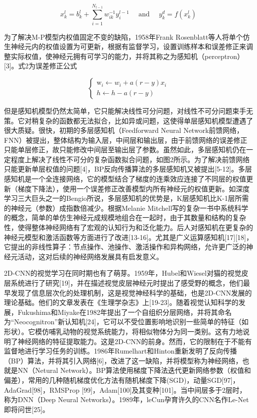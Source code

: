 \documentclass[15pt]{article}
\begin{document}
\begin{equation}
	x_{k}^{l}=b_{k}^{l}+\sum_{i=1}^{N_{l-1}} w_{i k}^{-1} y_{i}^{l-1} \quad \text { and } \quad y_{k}^{d}=f\left(x_{k}^{l}\right)
\end{equation}

为了解决M-P模型内权值固定不变的缺陷，1958年Frank Rosenblatt等人将单个仿生神经元内的权值设置为可更新，根据有监督学习，设置训练样本和误差修正来调整实际权值，使神经元拥有可学习的能力，并将其称之为感知机（perceptron）[3]。式2为误差修正公式

\begin{equation}
	\left\{\begin{array}{l}\mathrm{w}_{i} \leftarrow w_{i}+a(r-y) x_{i} \\ h \leftarrow h-a(r-y)\end{array}\right.
\end{equation}

但是感知机模型仍然太简单，它只能解决线性可分问题，对线性不可分问题束手无策。它对稍复杂的函数都无法拟合，比如异或问题，这使得单层感知机模型遭遇了很大质疑。很快，初期的多层感知机（Feedforward Neural Network前馈网络，FNN）被提出，整体结构为输入层，中间层和输出层，由于前馈网络的误差修正只能单层修正，故只能修改中间层至输出层了参数。虽然如此，多层感知机仍在一定程度上解决了线性不可分的复杂函数拟合问题，如图2所示。为了解决前馈网络只能更新单层权值的问题[4]，BP反向传播算法的多层感知机又被提出[5-12]。多层感知机是一个全连接网络，它的模型结合了梯度的连乘效应连接了不同层的权值更新（梯度下降法），使用一个误差修正改善模型内所有神经元的权值更新。如深度学习三大巨头之一的Bengio所说，多层感知机的优势是，K层感知机比K-1层所需的神经元（参数）成指数倍减少。根据Melanie Mitchell写的复杂一书中系统科学的概念，简单的单仿生神经元成规模地组合在一起时，由于其数量和结构的复杂性，使得整体神经网络有了宏观的认知行为和泛化能力。后人对感知机在更复杂的神经元模型和激活函数等方面进行了改进[13-16]。尤其是广义运算感知机[17][18]，它提出的非线性算子：节点操作、池操作、激活操作和异构网络，允许更广泛的神经元活动，这对后续的神经网络发展具有启发意义。

2D-CNN的视觉学习在同时期也有了萌芽。1959年，Hubel和Wiesel对猫的视觉皮层系统进行了研究[19]，并在描述视觉皮层神经元时提出了感受野的概念，他们最早发现了信息层次化的处理机制，这是视觉神经科学的基础，也是2D-CNN发展的理论基础。他们的文章发表在《生理学杂志》上[19-23]。随着视觉认知科学的发展，Fukushima和Miyake在1982年提出了一个自组织分层网络，并将其命名为“Neocognitron”新认知机[24]，它可以不受位置影响地识别一些简单的特征（如形状）。它模仿哺乳动物的视觉系统能力，将相似物体分为同一类别。这有力地说明了神经网络的特征提取能力。这是2D-CNN的前身。然而，它的限制在于不能有监督地进行学习任务的训练。1986年Rumelhart和Hinton重新发明了反向传播（BP）算法，并将其引入网络[6]，改进了这一缺陷，并将模型称为神经网络，也就是NN（Netural Network）。BP算法使用梯度下降法迭代更新网络参数（权值和偏差），常用的几种随机梯度优化方法有随机梯度下降(SGD)，动量SGD[97]，AdaGrad[98]，RMSProp [99]，Adam[100]及其变种[101]。当中间层多于2层时，称为DNN（Deep Neural Networks）。1989年，leCun孕育许久的CNN名作Le-Net即将问世[25]。
\end{document}
